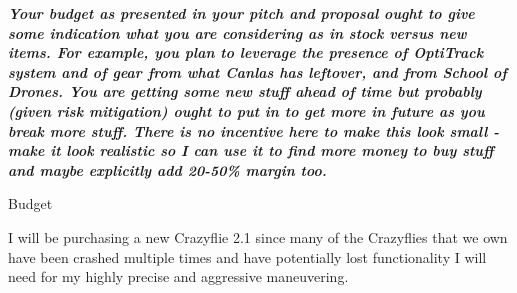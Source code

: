 \documentclass[onecolumn,10pt]{IEEEtran}
\newcommand{\myroot}{../}
\begin{document}
\emph{\textbf{Your budget as presented in your pitch and proposal ought to give some indication what you are considering as in stock versus new items. For example, you plan to leverage the presence of OptiTrack system and of gear from what Canlas has leftover, and from School of Drones. You are getting some new stuff ahead of time but probably (given risk mitigation) ought to put in to get more in future as you break more stuff. There is no incentive here to make this look small - make it look realistic so I can use it to find more money to buy stuff and maybe explicitly add 20-50\% margin too. }}

\begin{table}[hb]
\caption{Budget}
\label{table-budget}
\end{table}

I will be purchasing a new Crazyflie 2.1 since many of the Crazyflies that we own have been crashed multiple times and have potentially lost functionality I will need for my highly precise and aggressive maneuvering.



\end{document}
